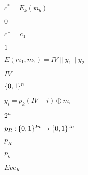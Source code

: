 \documentclass[10pt]{book}
\begin{document}
\begin{mdSnippets}
\begin{mdInlineSnippet}[ef31559dcdbd83704fc209021ae2b032]%
$c^* = E_k(m_b)$\end{mdInlineSnippet}%
\begin{mdInlineSnippet}%
$0$\end{mdInlineSnippet}%
\begin{mdInlineSnippet}[940ffc6df82a3183851f994403b54b09]%
$c* = c_0$\end{mdInlineSnippet}%
\begin{mdInlineSnippet}[c4ca4238a0b923820dcc509a6f75849b]%
$1$\end{mdInlineSnippet}%
\begin{mdInlineSnippet}[f1466d97999858e5d983fa44ff51f002]%
$E(m_1,m_2) = IV\|y_1\|y_2$\end{mdInlineSnippet}%
\begin{mdInlineSnippet}[cf482c5807b62034beeabdb795c5a689]%
$IV$\end{mdInlineSnippet}%
\begin{mdInlineSnippet}[5867c9b098884eca2779f6d98d4b0b29]%
$\{0,1\}^n$\end{mdInlineSnippet}%
\begin{mdInlineSnippet}[e151009690e1494d0a105f38f4b0d37a]%
$y_i=p_k(IV+i) \oplus m_i$\end{mdInlineSnippet}%
\begin{mdInlineSnippet}[d1db0d9c696a8c056e7117dbbb4ef6db]%
$2^n$\end{mdInlineSnippet}%
\begin{mdInlineSnippet}[dd255cf7779308907037ce817c8c024b]%
$p_R: \{0,1\}^{2n} \to \{0,1\}^{2n}$\end{mdInlineSnippet}%
\begin{mdInlineSnippet}[7f6d7c33c2a8c344844b1a031a10edaf]%
$p_R$\end{mdInlineSnippet}%
\begin{mdInlineSnippet}%
$p_k$\end{mdInlineSnippet}%
\begin{mdInlineSnippet}%
$Eve_{\Pi}$\end{mdInlineSnippet}%

\end{mdSnippets}
\end{document}
